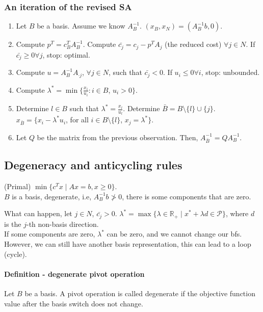 \documentclass[main]{subfiles}
\begin{document}
\subsubsection{An iteration of the revised SA}
\begin{enumerate}
\item Let $B$ be a basis. Assume we know $A^{-1}_B$. $(x_B, x_N) =
(A^{-1}_B b, 0)$.
\item Compute $p^T = c^T_B A^{-1}_B$. Compute $\bar{c_j} = c_j - p^T A_j$
(the reduced cost) $\forall j \in N$. If $\bar{c_j} \geq 0 \forall j$,
stop: optimal.
\item Compute $u = A^{-1}_B A_{\cdot j}$, $\forall j \in N$, such that
$\bar{c_j} < 0$. If $u_i \leq 0 \forall i$, stop: unbounded.
\item Compute $\lambda^* = \min \{\frac{x_i}{u_i} : i \in B$, $u_i > 0\}$.
\item Determine $l \in B$ such that $\lambda^* = \frac{x_l}{u_l}$. Determine
$\bar{B}= B\setminus \{l\} \cup \{j\}$.
$x_{\bar{B}} = \{ x_i - \lambda^* u_i$, for all $i \in B\setminus \{l\}$,
$x_j = \lambda^* \}$.
\item Let $Q$ be the matrix from the previous observation.
Then, $A^{-1}_{\bar{B}} = Q A^{-1}_B$.
\end{enumerate}

\subsection{Degeneracy and anticycling rules}
(Primal) $\min \{c^T x \mid Ax = b, x \geq 0 \}$.\\
$B$ is a basis, degenerate, i.e, $A^{-1}_B b \ngtr 0$, there is some components
that are zero.

What can happen, let $j \in N$, $\bar{c_j} > 0$. $\lambda^* = \max \{\lambda
\in \mathbb{R}_+ \mid x^* + \lambda d \in \mathcal{P}\}$, where $d$ is the
$j$-th non-basis direction.\\
If some components are zero, $\lambda^*$ can be zero, and we cannot change our
bfs. However, we can still have another basis representation, this can lead to
a loop (cycle).

\paragraph{Definition - degenerate pivot operation} Let $B$ be a basis.
A pivot operation is called degenerate if the objective function value after
the basis switch does not change.
\end{document}
